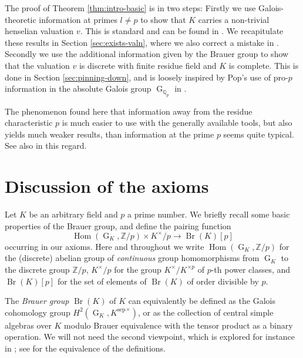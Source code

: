 \documentclass[a4paper, british, oneside]{amsart}
\newcommand{\Z}{\mathbb{Z}}
\newcommand{\Q}{\mathbb{Q}}
\DeclareMathOperator{\G}{G}
\DeclareMathOperator{\Br}{Br}
\DeclareMathOperator{\Hom}{Hom}
\theoremstyle{definition}
\theoremstyle{remark}
\begin{document}
The proof of Theorem \ref{thm:intro-basic} is in two steps:
Firstly we use Galois-theoretic information at primes $l \neq p$ to show that $K$ carries a non-trivial henselian valuation $v$.
This is standard and can be found in \cite{EfratFesenko}.
We recapitulate these results in Section \ref{sec:exists-valn}, where we also correct a mistake in \cite{EfratFesenko}.
Secondly we use the additional information given by the Brauer group to show that the valuation $v$ is discrete with finite residue field and $K$ is complete.
This is done in Section \ref{sec:pinning-down}, and is loosely inspired by Pop's use of pro-$p$ information in the absolute Galois group $\G_{\Q_p}$ in \cite[Theorem E.9]{Pop_GaloisscheKennzeichnung}.

The phenomenon found here that information away from the residue characteristic $p$ is much easier to use with the generally available tools,
but also yields much weaker results, than information at the prime $p$ seems quite typical.
See also \cite{KoenigsmannStrommen} in this regard.

\section{Discussion of the axioms}
\label{sec:explaining}

Let $K$ be an arbitrary field and $p$ a prime number.
We briefly recall some basic properties of the Brauer group, and define the pairing function
\[ \Hom(\G_K, \Z/p) \times K^\times/p \to \Br(K)[p] \]
occurring in our axioms.
Here and throughout we write $\Hom(\G_K, \Z/p)$ for the (discrete) abelian group of \emph{continuous} group homomorphisms from $\G_K$ to the discrete group $\Z/p$,
$K^\times/p$ for the group $K^\times/K^{\times p}$ of $p$-th power classes, and $\Br(K)[p]$ for the set of elements of $\Br(K)$ of order divisible by $p$.

The \emph{Brauer group} $\Br(K)$ of $K$ can equivalently be defined as the Galois cohomology group $H^2(\G_K, {K^{\mathrm{sep}}}^\times)$, or as the collection of central simple algebras over $K$ modulo Brauer equivalence with the tensor product as a binary operation.
We will not need the second viewpoint, which is explored for instance in \cite[§2.4]{GilleSzamuely_2nd}; see \cite[Theorem 4.4.3]{GilleSzamuely_2nd} for the equivalence of the definitions.
\end{document}
